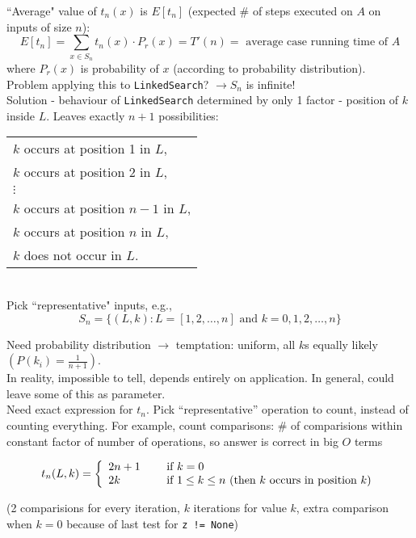 \noindent ``Average" value of $t_n(x)$ is $E[t_n]$ (expected \# of steps executed on $A$ on inputs of size $n$): \\
$$E[t_n] = \sum_{x \in S_n} t_n(x) \cdot P_r(x) = T'(n) = \textrm{ average case running time of } A$$
where $P_r(x)$ is probability of $x$ (according to probability distribution). \\


\noindent Problem applying this to \texttt{LinkedSearch}? $\rightarrow S_n$ is infinite! \\
Solution - behaviour of \texttt{LinkedSearch} determined by only 1 factor - position of $k$ inside $L$. 
Leaves exactly $n+1$ possibilities: \\

\begin{tabular}{l}
	$k$ occurs at position 1 in $L$, \\
	$k$ occurs at position 2 in $L$, \\
	$\vdots$ \\
	$k$ occurs at position $n-1$ in $L$, \\
	$k$ occurs at position $n$ in $L$, \\
	$k$ does not occur in $L$.
\end{tabular} \\

\noindent Pick ``representative" inputs, e.g., 
$$S_n = \{(L,k): L=[1,2,\ldots, n] \textrm{ and } k=0,1,2,\ldots,n\}$$

\noindent Need probability distribution $\rightarrow$ temptation: uniform, all $k$s equally likely $\left (P(k_i) = \frac{1}{n+1} \right )$. \\
In reality, impossible to tell, depends entirely on application. In general, could leave some of this as parameter. \\

\noindent Need exact expression for $t_n$. Pick ``representative'' operation to count, instead of counting everything.
	For example, count comparisons: \# of comparisions within constant factor of number of operations, so answer is 
	correct in big $O$ terms

$$t_n(L,k) = \left\{
	\begin{array}{l l}
		2n+1 & \quad \textrm{ if }k=0 \\
		2k & \quad \textrm{ if } 1 \leq k \leq n \textrm{ (then }k\textrm{ occurs in position }k\textrm{)}
	\end{array} \right .$$

\noindent (2 comparisions for every iteration, $k$ iterations for value $k$, extra comparison when $k=0$ because of last
	test for \texttt{z != None})

